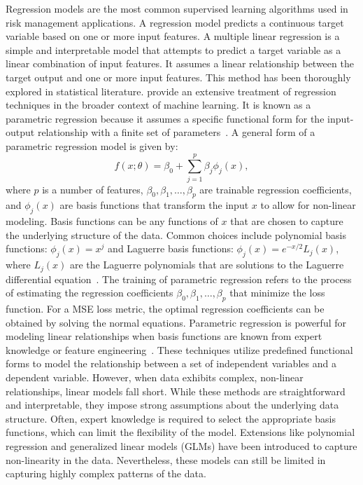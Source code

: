 Regression models are the most common supervised learning algorithms used in risk management applications.
A regression model predicts a continuous target variable based on one or more input features.
A multiple linear regression is a simple and interpretable model that attempts to predict a target variable as a linear combination of input features.
It assumes a linear relationship between the target output and one or more input features.
This method has been thoroughly explored in statistical literature.
\citet{bishop2006pattern} provide an extensive treatment of regression techniques in the broader context of machine learning.
It is known as a parametric regression because it assumes a specific functional form for the input-output relationship with a finite set of parameters~\citep{seber2012linear}.
A general form of a parametric regression model is given by:
\begin{equation} \label{eq:regression}
    f(x; \theta) = \beta_0 + \sum_{j=1}^{p} \beta_j \phi_j(x),
\end{equation}
where $p$ is a number of features, $\beta_0, \beta_1, \ldots, \beta_p$ are trainable regression coefficients, and $\phi_j(x)$ are basis functions that transform the input $x$ to allow for non-linear modeling.
Basis functions can be any functions of $x$ that are chosen to capture the underlying structure of the data.
Common choices include polynomial basis functions: $\phi_j(x) = x^j$ and Laguerre basis functions: $\phi_j(x) = e^{-x/2} L_j(x)$, where $L_j(x)$ are the Laguerre polynomials that are solutions to the Laguerre differential equation~\citep{szeg1939orthogonal}.
The training of parametric regression refers to the process of estimating the regression coefficients $\beta_0, \beta_1, \ldots, \beta_p$ that minimize the loss function.
For a MSE loss metric, the optimal regression coefficients can be obtained by solving the normal equations.
Parametric regression is powerful for modeling linear relationships when basis functions are known from expert knowledge or feature engineering~\citep{hastie2009elements}.
These techniques utilize predefined functional forms to model the relationship between a set of independent variables and a dependent variable.
However, when data exhibits complex, non-linear relationships, linear models fall short.
While these methods are straightforward and interpretable, they impose strong assumptions about the underlying data structure.
Often, expert knowledge is required to select the appropriate basis functions, which can limit the flexibility of the model.
Extensions like polynomial regression and generalized linear models (GLMs) have been introduced to capture non-linearity in the data.
Nevertheless, these models can still be limited in capturing highly complex patterns of the data.


